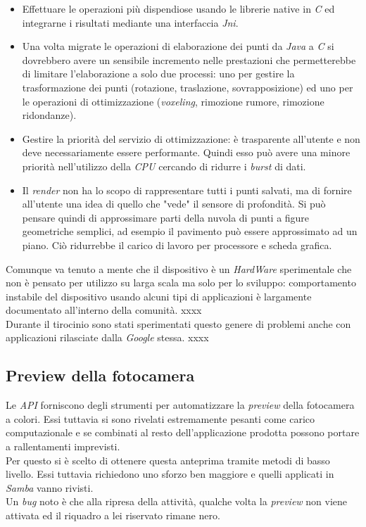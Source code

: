 \begin{itemize}
	\item Effettuare le operazioni più dispendiose usando le librerie native in \emph{C} ed integrarne i risultati mediante una interfaccia \emph{Jni}.
	\item Una volta migrate le operazioni di elaborazione dei punti da \emph{Java} a \emph{C} si dovrebbero avere un sensibile incremento nelle prestazioni che permetterebbe di limitare l'elaborazione a solo due processi: uno per gestire la trasformazione dei punti (rotazione, traslazione, sovrapposizione) ed uno per le operazioni di ottimizzazione (\emph{voxeling}, rimozione rumore, rimozione ridondanze).
	\item Gestire la priorità del servizio di ottimizzazione: è trasparente all'utente e non deve necessariamente essere performante. Quindi esso può avere una minore priorità nell'utilizzo della \emph{CPU} cercando di ridurre i \emph{burst} di dati.
	\item Il \emph{render} non ha lo scopo di rappresentare tutti i punti salvati, ma di fornire all'utente una idea di quello che "vede" il sensore di profondità. Si può pensare quindi di approssimare parti della nuvola di punti a figure geometriche semplici, ad esempio il pavimento può essere approssimato ad un piano. Ciò ridurrebbe il carico di lavoro per processore e scheda grafica.
\end{itemize}
Comunque va tenuto a mente che il dispositivo è un \emph{HardWare} sperimentale che non è pensato per utilizzo su larga scala ma solo per lo sviluppo: comportamento instabile del dispositivo usando alcuni tipi di applicazioni è largamente documentato all'interno della comunità. xxxx\\
Durante il tirocinio sono stati sperimentati questo genere di problemi anche con applicazioni rilasciate dalla \emph{Google} stessa. xxxx

\subsection{Preview della fotocamera}
Le \emph{API} forniscono degli strumenti per automatizzare la \emph{preview} della fotocamera a colori. Essi tuttavia si sono rivelati estremamente pesanti come carico computazionale e se combinati al resto dell'applicazione prodotta possono portare a rallentamenti imprevisti.\\
Per questo si è scelto di ottenere questa anteprima tramite metodi di basso livello. Essi tuttavia richiedono uno sforzo ben maggiore e quelli applicati in \emph{Samba} vanno rivisti.\\
Un \emph{bug} noto è che alla ripresa della attività, qualche volta la \emph{preview} non viene attivata ed il riquadro a lei riservato rimane nero.


